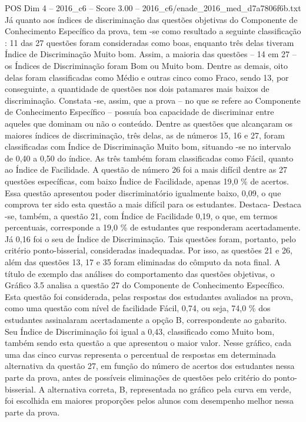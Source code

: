 \begin{textsample}{POS Dim 4 – 2016\_c6 – Score 3.00 – 2016\_c6/enade\_2016\_med\_d7a7806f6b.txt}
Já quanto aos índices de discriminação das questões objetivas do Componente de Conhecimento Específico da prova, tem -se como resultado a seguinte classificação : 11 das 27 questões foram consideradas como boas, enquanto três delas tiveram Índice de Discriminação Muito bom.
Assim, a maioria das questões – 14 em 27 – os Índices de Discriminação foram Bom ou Muito bom.
Dentre as demais, oito delas foram classificadas como Médio e outras cinco como Fraco, sendo 13, por conseguinte, a quantidade de questões nos dois patamares mais baixos de discriminação.
Constata -se, assim, que a prova – no que se refere ao Componente de Conhecimento Específico – possuía boa capacidade de discriminar entre aqueles que dominam ou não o conteúdo.
Dentre as questões que alcançaram os maiores índices de discriminação, três delas, as de números 15, 16 e 27, foram classificadas com Índice de Discriminação Muito bom, situando -se no intervalo de 0,40 a 0,50 do índice.
As três também foram classificadas como Fácil, quanto ao Índice de Facilidade.
A questão de número 26 foi a mais difícil dentre as 27 questões específicas, com baixo Índice de Facilidade, apenas 19,0 \% de acertos.
Essa questão apresentou poder discriminatório igualmente baixo, 0,09, o que comprova ter sido esta questão a mais difícil para os estudantes.
Destaca- Destaca -se, também, a questão 21, com Índice de Facilidade 0,19, o que, em termos percentuais, corresponde a 19,0 \% de estudantes que responderam acertadamente.
Já 0,16 foi o seu de Índice de Discriminação.
Tais questões foram, portanto, pelo critério ponto-bisserial, consideradas inadequadas.
Por isso, as questões 21 e 26, além das questões 13, 17 e 35 foram eliminadas do cômputo da nota final.
A título de exemplo das análises do comportamento das questões objetivas, o Gráfico 3.5 analisa a questão 27 do Componente de Conhecimento Específico.
Esta questão foi considerada, pelas respostas dos estudantes avaliados na prova, como uma questão com nível de facilidade Fácil, 0,74, ou seja, 74,0 \% dos estudantes assinalaram acertadamente a opção B, correspondente ao gabarito.
Seu Índice de Discriminação foi igual a 0,43, classificado como Muito bom, também sendo esta questão a que apresentou o maior valor.
Nesse gráfico, cada uma das cinco curvas representa o percentual de respostas em determinada alternativa da questão 27, em função do número de acertos dos estudantes nessa parte da prova, antes de possíveis eliminações de questões pelo critério do ponto-bisserial.
A alternativa correta, B, representada no gráfico pela curva em verde, foi escolhida em maiores proporções pelos alunos com desempenho melhor nessa parte da prova.

\end{textsample}
